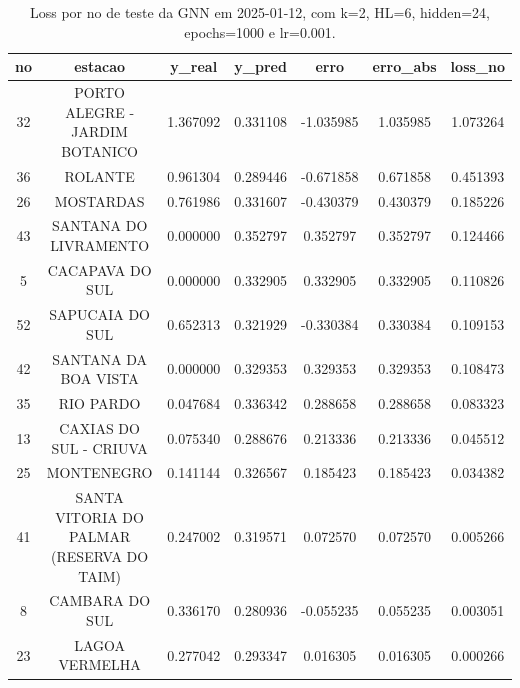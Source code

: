 \begin{table}[h]
\centering
\caption{Loss por no de teste da GNN em 2025-01-12, com k=2, HL=6, hidden=24, epochs=1000 e lr=0.001.}
\label{tab:gnn_loss_k2_hl6_h24_e1000_d20250112}
\begin{tabular}{ccccccc}
\toprule
no & estacao & y\_real & y\_pred & erro & erro\_abs & loss\_no \\
\midrule
32 & PORTO ALEGRE - JARDIM BOTANICO & 1.367092 & 0.331108 & -1.035985 & 1.035985 & 1.073264 \\
36 & ROLANTE & 0.961304 & 0.289446 & -0.671858 & 0.671858 & 0.451393 \\
26 & MOSTARDAS & 0.761986 & 0.331607 & -0.430379 & 0.430379 & 0.185226 \\
43 & SANTANA DO LIVRAMENTO & 0.000000 & 0.352797 & 0.352797 & 0.352797 & 0.124466 \\
5 & CACAPAVA DO SUL & 0.000000 & 0.332905 & 0.332905 & 0.332905 & 0.110826 \\
52 & SAPUCAIA DO SUL & 0.652313 & 0.321929 & -0.330384 & 0.330384 & 0.109153 \\
42 & SANTANA DA BOA VISTA & 0.000000 & 0.329353 & 0.329353 & 0.329353 & 0.108473 \\
35 & RIO PARDO & 0.047684 & 0.336342 & 0.288658 & 0.288658 & 0.083323 \\
13 & CAXIAS DO SUL - CRIUVA & 0.075340 & 0.288676 & 0.213336 & 0.213336 & 0.045512 \\
25 & MONTENEGRO & 0.141144 & 0.326567 & 0.185423 & 0.185423 & 0.034382 \\
41 & SANTA VITORIA DO PALMAR (RESERVA DO TAIM) & 0.247002 & 0.319571 & 0.072570 & 0.072570 & 0.005266 \\
8 & CAMBARA DO SUL & 0.336170 & 0.280936 & -0.055235 & 0.055235 & 0.003051 \\
23 & LAGOA VERMELHA & 0.277042 & 0.293347 & 0.016305 & 0.016305 & 0.000266 \\
\bottomrule
\end{tabular}
\end{table}
